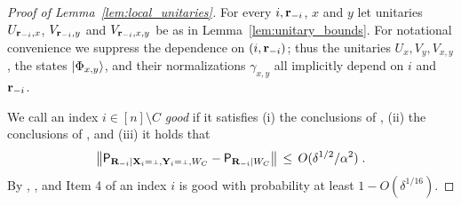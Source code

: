 \begin{proof}[Proof of Lemma~\ref{lem:local_unitaries}]
For every $i,\mathbf{r}_{-i}$, $x$ and $y$ let unitaries $U_{\mathbf{r}_{-i}, x}$, $V_{\mathbf{r}_{-i}, y}$ and $V_{{\mathbf{r}_{-i} , x,y}}$ be as in Lemma~\ref{lem:unitary_bounds}. For notational convenience we suppress the dependence on $(i, \mathbf{r}_{-i})$; thus the unitaries $U_x, V_y, V_{x,y}$, the states ${|\Phi_{x,y}\rangle}$, and their normalizations $\gamma_{x,y}$ all implicitly depend on $i$ and $\mathbf{r}_{-i}$. 

We call an index $i \in [n] \setminus C$ \emph{good} if it satisfies (i) the conclusions of , (ii) the conclusions of , and (iii) it holds that
\begin{equation}\label{eq:good-i-cond}
\left \| \P_{\bR_\mi | \bX_i = \dummy, \bY_i = \dummy,W_C} - \P_{\bR_\mi | W_C} \right \| \,\leq\, O(\delta^{1/2}/\alpha^2)\;.
\end{equation}
By , , and Item 4 of  an index $i$ is good with probability at least $1 - O(\delta^{1/16})$.


\end{proof}
